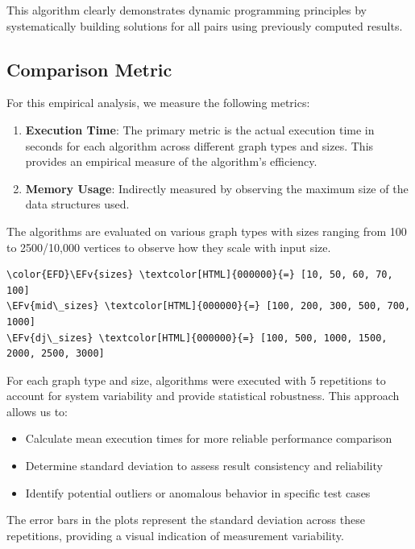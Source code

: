 \documentclass[a4paper,12pt]{article}
\newcommand{\EFv}[1]{\textcolor{EFv}{#1}} %
\begin{document}
This algorithm clearly demonstrates dynamic programming principles by systematically building solutions for all pairs using previously computed results.
\subsection{Comparison Metric}
\label{sec:org365ef50}
For this empirical analysis, we measure the following metrics:

\begin{enumerate}
\item \textbf{\textbf{Execution Time}}: The primary metric is the actual execution time in seconds for each algorithm across different graph types and sizes. This provides an empirical measure of the algorithm's efficiency.

\item \textbf{\textbf{Memory Usage}}: Indirectly measured by observing the maximum size of the data structures used.
\end{enumerate}

The algorithms are evaluated on various graph types with sizes ranging from 100 to 2500/10,000 vertices to observe how they scale with input size.

\begin{Code}
\begin{Verbatim}
\color{EFD}\EFv{sizes} \textcolor[HTML]{000000}{=} [10, 50, 60, 70, 100]
\EFv{mid\_sizes} \textcolor[HTML]{000000}{=} [100, 200, 300, 500, 700, 1000]
\EFv{dj\_sizes} \textcolor[HTML]{000000}{=} [100, 500, 1000, 1500, 2000, 2500, 3000]
\end{Verbatim}
\end{Code}

For each graph type and size, algorithms were executed with 5 repetitions to account for system variability and provide statistical robustness. This approach allows us to:

\begin{itemize}
\item Calculate mean execution times for more reliable performance comparison
\item Determine standard deviation to assess result consistency and reliability
\item Identify potential outliers or anomalous behavior in specific test cases
\end{itemize}

The error bars in the plots represent the standard deviation across these repetitions, providing a visual indication of measurement variability.
\end{document}
